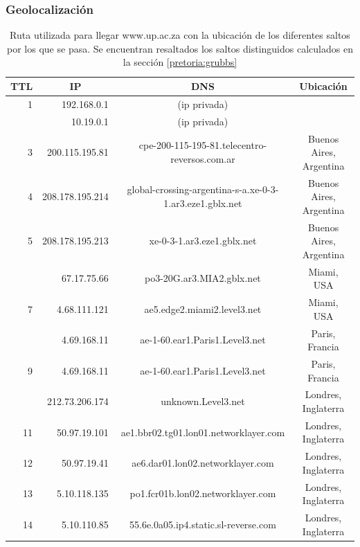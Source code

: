 \subsubsection{Geolocalización}

\begin{table}[H]
    \begin{center}
        \begin{tabular}{| r | r | c | c |}
  \hline
  {\bf TTL} & \multicolumn{1}{|c|}{\bf IP} & {\bf DNS} & {\bf Ubicación}\\
  \hline
\hline 1  & 192.168.0.1 & (ip privada) & \\
\rowcolor{blue!25}\hline 2  & 10.19.0.1 & (ip privada) & \\
\hline 3  & 200.115.195.81 & cpe-200-115-195-81.telecentro-reversos.com.ar & Buenos Aires, Argentina\\
\hline 4  & 208.178.195.214 & global-crossing-argentina-s-a.xe-0-3-1.ar3.eze1.gblx.net & Buenos Aires, Argentina\\ 
\hline 5  & 208.178.195.213 & xe-0-3-1.ar3.eze1.gblx.net & Buenos Aires, Argentina\\ 
\rowcolor{blue!25}\hline 6  & 67.17.75.66 &  po3-20G.ar3.MIA2.gblx.net & Miami, USA\\ 
\hline 7  & 4.68.111.121 &  ae5.edge2.miami2.level3.net  & Miami, USA\\ 
\rowcolor{blue!25}\hline 8  & 4.69.168.11 & ae-1-60.ear1.Paris1.Level3.net & Paris, Francia\\ 
\hline 9  & 4.69.168.11 & ae-1-60.ear1.Paris1.Level3.net & Paris, Francia\\ 
\rowcolor{blue!25}\hline 10  & 212.73.206.174 & unknown.Level3.net & Londres, Inglaterra\\ 
\hline 11  & 50.97.19.101 & ae1.bbr02.tg01.lon01.networklayer.com & Londres, Inglaterra\\ 
\hline 12  & 50.97.19.41 & ae6.dar01.lon02.networklayer.com & Londres, Inglaterra\\ 
\hline 13  & 5.10.118.135 & po1.fcr01b.lon02.networklayer.com & Londres, Inglaterra\\ 
\hline 14  & 5.10.110.85 &  55.6e.0a05.ip4.static.sl-reverse.com & Londres, Inglaterra\\ 
\hline
        \end{tabular}
        \caption{Ruta utilizada para llegar www.up.ac.za con la ubicación de los diferentes saltos por los que se pasa. Se encuentran resaltados los saltos distinguidos calculados en la sección \ref{pretoria:grubbs}}
        \label{table:pretoria} 
    \end{center}
\end{table}


